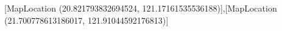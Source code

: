 [MapLocation (20.821793832694524, 121.17161535536188)],[MapLocation (21.700778613186017, 121.91044592176813)]